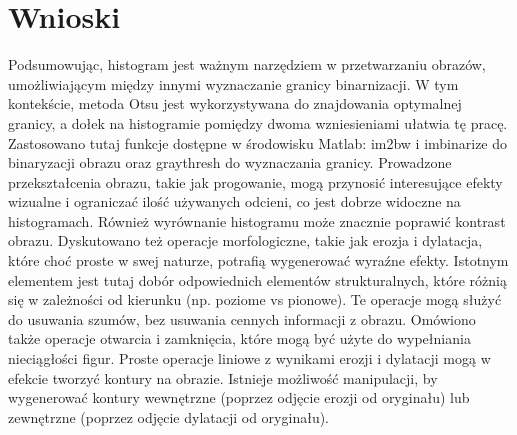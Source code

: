 \documentclass[10pt,a4paper,twoside]{article}%
\begin{document}
\section{Wnioski}
Podsumowując, histogram jest ważnym narzędziem w przetwarzaniu obrazów, umożliwiającym między innymi wyznaczanie granicy binarnizacji. W tym kontekście, metoda Otsu jest wykorzystywana do znajdowania optymalnej granicy, a dołek na histogramie pomiędzy dwoma wzniesieniami ułatwia tę pracę. Zastosowano tutaj funkcje dostępne w środowisku Matlab: im2bw i imbinarize do binaryzacji obrazu oraz graythresh do wyznaczania granicy. Prowadzone przekształcenia obrazu, takie jak progowanie, mogą przynosić interesujące efekty wizualne i ograniczać ilość używanych odcieni, co jest dobrze widoczne na histogramach. Również wyrównanie histogramu może znacznie poprawić kontrast obrazu. Dyskutowano też operacje morfologiczne, takie jak erozja i dylatacja, które choć proste w swej naturze, potrafią wygenerować wyraźne efekty. Istotnym elementem jest tutaj dobór odpowiednich elementów strukturalnych, które różnią się w zależności od kierunku (np. poziome vs pionowe). Te operacje mogą służyć do usuwania szumów, bez usuwania cennych informacji z obrazu. Omówiono także operacje otwarcia i zamknięcia, które mogą być użyte do wypełniania nieciągłości figur. Proste operacje liniowe z wynikami erozji i dylatacji mogą w efekcie tworzyć kontury na obrazie. Istnieje możliwość manipulacji, by wygenerować kontury wewnętrzne (poprzez odjęcie erozji od oryginału) lub zewnętrzne (poprzez odjęcie dylatacji od oryginału).
\end{document}
